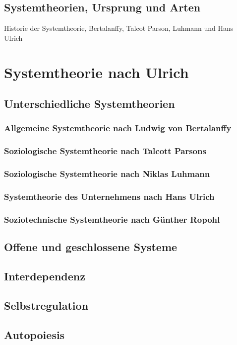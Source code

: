 \documentclass[a4paper,12pt]{article}
\begin{document}
\subsection{Systemtheorien, Ursprung und Arten}
Historie der Systemtheorie, Bertalanffy, Talcot Parson, Luhmann und Hans Ulrich

\section{Systemtheorie nach Ulrich}
\subsection{Unterschiedliche Systemtheorien}
\subsubsection{Allgemeine Systemtheorie nach Ludwig von Bertalanffy}
\subsubsection{Soziologische Systemtheorie nach Talcott Parsons}
\subsubsection{Soziologische Systemtheorie nach Niklas Luhmann}
\subsubsection{Systemtheorie des Unternehmens nach Hans Ulrich}
\subsubsection{Soziotechnische Systemtheorie nach Günther Ropohl}

\subsection{Offene und geschlossene Systeme}
\subsection{Interdependenz}
\subsection{Selbstregulation}
\subsection{Autopoiesis}
\end{document}
